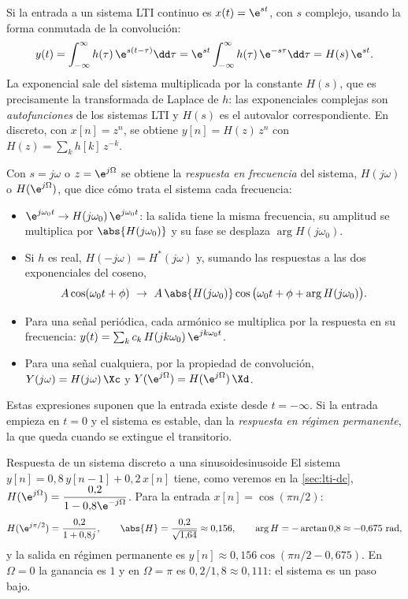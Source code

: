 \documentclass[11pt,a4paper]{scrartcl}
\begin{document}
Si la entrada a un sistema LTI continuo es $x(t)=\e^{st}$, con $s$ complejo, usando la forma conmutada de la convolución:
\[
  y(t)=\int_{-\infty}^{\infty}h(\tau)\,\e^{s(t-\tau)}\dd\tau
  =\e^{st}\int_{-\infty}^{\infty}h(\tau)\,\e^{-s\tau}\dd\tau
  =H(s)\,\e^{st}.
\]
La exponencial sale del sistema multiplicada por la constante $H(s)$, que es precisamente la transformada de Laplace de $h$: las exponenciales complejas son \emph{autofunciones} de los sistemas LTI y $H(s)$ es el autovalor correspondiente. En discreto, con $x[n]=z^n$, se obtiene $y[n]=H(z)\,z^n$ con $H(z)=\sum_kh[k]\,z^{-k}$.

Con $s=j\omega$ o $z=\e^{j\Omega}$ se obtiene la \emph{respuesta en frecuencia} del sistema, $H(j\omega)$ o $H(\e^{j\Omega})$, que dice cómo trata el sistema cada frecuencia:
\begin{itemize}
  \item $\e^{j\omega_0t}\to H(j\omega_0)\,\e^{j\omega_0t}$: la salida tiene la misma frecuencia, su amplitud se multiplica por $\abs{H(j\omega_0)}$ y su fase se desplaza $\arg H(j\omega_0)$.
  \item Si $h$ es real, $H(-j\omega)=H^*(j\omega)$ y, sumando las respuestas a las dos exponenciales del coseno,
  \[A\cos(\omega_0t+\phi)\ \to\ A\,\abs{H(j\omega_0)}\cos\big(\omega_0t+\phi+\arg H(j\omega_0)\big).\]
  \item Para una señal periódica, cada armónico se multiplica por la respuesta en su frecuencia: $y(t)=\sum_kc_k\,H(jk\omega_0)\,\e^{jk\omega_0t}$.
  \item Para una señal cualquiera, por la propiedad de convolución, $Y(j\omega)=H(j\omega)\,\Xc$ y $Y(\e^{j\Omega})=H(\e^{j\Omega})\,\Xd$.
\end{itemize}
Estas expresiones suponen que la entrada existe desde $t=-\infty$. Si la entrada empieza en $t=0$ y el sistema es estable, dan la \emph{respuesta en régimen permanente}, la que queda cuando se extingue el transitorio.

\begin{ejemplo}{Respuesta de un sistema discreto a una sinusoide}{sinusoide}
  El sistema $y[n]=0{,}8\,y[n-1]+0{,}2\,x[n]$ tiene, como veremos en la \cref{sec:lti-dc}, $H(\e^{j\Omega})=\dfrac{0{,}2}{1-0{,}8\e^{-j\Omega}}$. Para la entrada $x[n]=\cos(\pi n/2)$:
  \[
    H(\e^{j\pi/2})=\frac{0{,}2}{1+0{,}8j},\qquad \abs{H}=\frac{0{,}2}{\sqrt{1{,}64}}\approx0{,}156,\qquad \arg H=-\arctan0{,}8\approx-0{,}675\ \text{rad},
  \]
  y la salida en régimen permanente es $y[n]\approx0{,}156\cos(\pi n/2-0{,}675)$. En $\Omega=0$ la ganancia es $1$ y en $\Omega=\pi$ es $0{,}2/1{,}8\approx0{,}111$: el sistema es un paso bajo.
\end{ejemplo}
\end{document}

